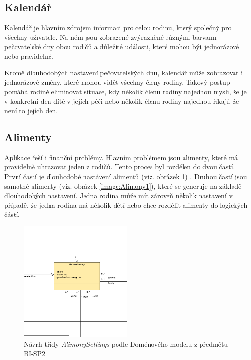     \subsection{Kalendář}    
        Kalendář je hlavním zdrojem informaci pro celou rodinu, který společný pro všechny uživatele. Na něm jsou zobrazené zvýrazněné různými barvami pečovatelské dny obou rodičů a důležité události, které mohou být jednorázové nebo pravidelné. 
        
        Kromě dlouhodobých nastavení pečovatelských dnu, kalendář může zobrazovat i jednorázové změny, které mohou vidět všechny členy rodiny. Takový postup pomáhá rodině eliminovat situace, kdy několik členu rodiny najednou myslí, že je v konkretní den dítě v jejích péči nebo několik členu rodiny najednou říkají, že není to jejích den.  
    \subsection{Alimenty}    
        Aplikace řeší i finanční problémy. Hlavním problémem jsou alimenty, které má pravidelně uhrazovat jeden z rodičů. Tento proces byl rozdělen do dvou častí. První častí je dlouhodobé nastávení alimentů (viz. obrázek \ref{image:AlimonySettings1}) . Druhou častí jsou samotné alimenty (viz. obrázek \ref{image:Alimony1}), které se generuje na základě dlouhodobých nastavení. Jedna rodina může mít zároveň několik nastavení v případě, že jedna rodina má několik dětí nebo chce rozdělit alimenty do logických částí.
        \begin{figure}\centering
	        \includegraphics[width=0.5\textwidth]{pdfs/AlimonySettings1}
	        \caption[Návrh AlimonySettings]{Návrh třídy \textit{AlimonySettings} podle Doménového modelu z předmětu BI-SP2}\label{image:AlimonySettings1}
        \end{figure}
